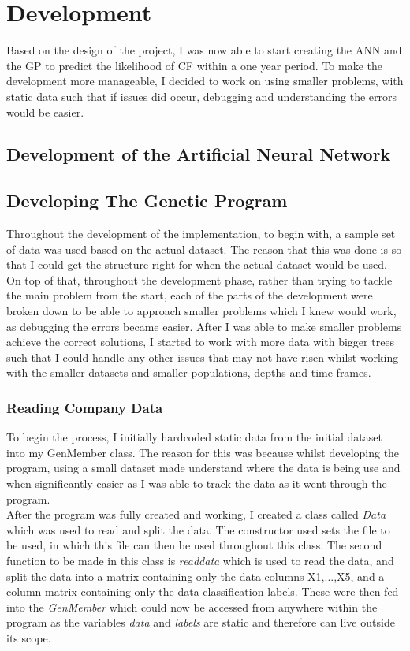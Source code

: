 \documentclass[11pt]{article}
\begin{document}
\section{Development}
Based on the design of the project, I was now able to start creating the ANN and the GP to predict the likelihood of CF within a one year period. To make the development more manageable, I decided to work on using smaller problems, with static data such that if issues did occur, debugging and understanding the errors would be easier. \\
\subsection{Development of the Artificial Neural Network}
\subsection{Developing The Genetic Program}

Throughout the development of the implementation, to begin with, a sample set of data was used based on the actual dataset. The reason that this was done is so that I could get the structure right for when the actual dataset would be used. On top of that, throughout the development phase, rather than trying to tackle the main problem from the start, each of the parts of the development were broken down to be able to approach smaller problems which I knew would work, as debugging the errors became easier. After I was able to make smaller problems achieve the correct solutions, I started to work with more data with bigger trees such that I could handle any other issues that may not have risen whilst working with the smaller datasets and smaller populations, depths and time frames. 
\subsubsection{Reading Company Data}
To begin the process, I initially hardcoded static data from the initial dataset into my GenMember class. The reason for this was because whilst developing the program, using a small dataset made understand where the data is being use and when significantly easier as I was able to track the data as it went through the program.\\
After the program was fully created and working, I created a class called \textit{Data} which was used to read and split the data. The constructor used sets the file to be used, in which this file can then be used throughout this class. The second function to be made in this class is \textit{read\textunderscore data} which is used to read the data, and split the data into a matrix containing only the data columns X1,...,X5, and a column matrix containing only the data classification labels. These were then fed into the \textit{GenMember} which could now be accessed from anywhere within the program as the variables \textit{data} and \textit{labels} are static and therefore can live outside its scope.  
\end{document}
